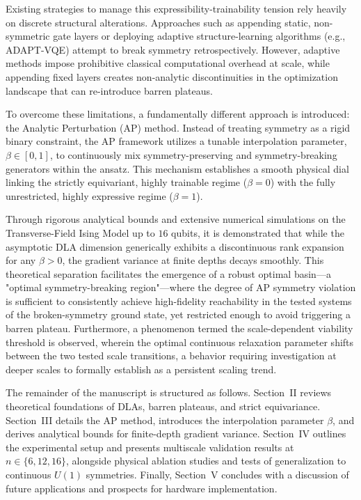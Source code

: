 \documentclass[10pt,twocolumn]{article}
\theoremstyle{remark}
\begin{document}
Existing strategies to manage this expressibility-trainability tension rely heavily on discrete structural alterations. Approaches such as appending static, non-symmetric gate layers or deploying adaptive structure-learning algorithms (e.g., ADAPT-VQE) attempt to break symmetry retrospectively. However, adaptive methods impose prohibitive classical computational overhead at scale, while appending fixed layers creates non-analytic discontinuities in the optimization landscape that can re-introduce barren plateaus.

To overcome these limitations, a fundamentally different approach is introduced: the Analytic Perturbation (AP) method. Instead of treating symmetry as a rigid binary constraint, the AP framework utilizes a tunable interpolation parameter, $\beta \in [0, 1]$, to continuously mix symmetry-preserving and symmetry-breaking generators within the ansatz. This mechanism establishes a smooth physical dial linking the strictly equivariant, highly trainable regime ($\beta=0$) with the fully unrestricted, highly expressive regime ($\beta=1$).

Through rigorous analytical bounds and extensive numerical simulations on the Transverse-Field Ising Model up to $16$ qubits, it is demonstrated that while the asymptotic DLA dimension generically exhibits a discontinuous rank expansion for any $\beta > 0$, the gradient variance at finite depths decays smoothly. This theoretical separation facilitates the emergence of a robust optimal basin---a "optimal symmetry-breaking region"---where the degree of AP symmetry violation is sufficient to consistently achieve high-fidelity reachability in the tested systems of the broken-symmetry ground state, yet restricted enough to avoid triggering a barren plateau. Furthermore, a phenomenon termed the scale-dependent viability threshold is observed, wherein the optimal continuous relaxation parameter shifts between the two tested scale transitions, a behavior requiring investigation at deeper scales to formally establish as a persistent scaling trend.

The remainder of the manuscript is structured as follows. Section~II reviews theoretical foundations of DLAs, barren plateaus, and strict equivariance. Section~III details the AP method, introduces the interpolation parameter $\beta$, and derives analytical bounds for finite-depth gradient variance. Section~IV outlines the experimental setup and presents multiscale validation results at $n \in \{6, 12, 16\}$, alongside physical ablation studies and tests of generalization to continuous $U(1)$ symmetries. Finally, Section~V concludes with a discussion of future applications and prospects for hardware implementation.
\end{document}
